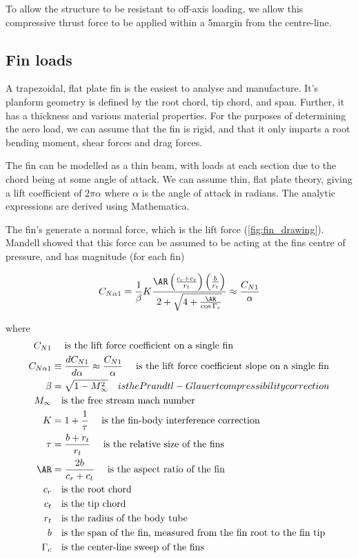 \documentclass[11pt]{article}
\newcommand{\eqn}[1]{\begin{equation}#1\end{equation}}
\newcommand{\eqnalign}[1]{\begin{align*}#1\end{align*}}
\begin{document}
To allow the structure to be resistant to off-axis loading, we allow this compressive thrust force to be applied within a 5\degree margin from the centre-line. 

\subsection{Fin loads}

A trapezoidal, flat plate fin is the easiest to analyse and manufacture. It's planform geometry is defined by the root chord, tip chord, and span. Further, it has a thickness and various material properties. For the purposes of determining the aero load, we can assume that the fin is rigid, and that it only imparts a root bending moment, shear forces and drag forces. 

The fin can be modelled as a thin beam, with loads at each section due to the chord being at some angle of attack. We can assume thin, flat plate theory, giving a lift coefficient of $2\pi \alpha$ where $\alpha$ is the angle of attack in radians. The analytic expressions are derived using Mathematica. 

The fin's generate a normal force, which is the lift force (\autoref{fig:fin_drawing}). Mandell \cite{mandell1973topics} showed that this force can be assumed to be acting at the fins centre of pressure, and has magnitude (for each fin)

\eqn{
C_{N\alpha1} = \frac{1}{\beta} K \frac{\AR \left(\frac{c_r + c_t}{r_t}\right)\left( \frac{b}{r_t}\right) }{2 + \sqrt{4 + \frac{\AR}{\cos \Gamma_c}} } \approx \frac{C_{N1}}{\alpha}
}

where 
\eqnalign{
C_{N1} & \quad \text{ is the lift force coefficient on a single fin}\\
C_{N\alpha1} &\equiv \frac{dC_{N1}}{d\alpha} \approx \frac{C_{N1}}{\alpha}  \quad \text{ is the lift force coefficient slope on a single fin}\\
\beta &=\sqrt{1-M_\infty^2} \quad {is the Prandtl-Glauert compressibility correction}\\
M_\infty & \quad \text{is the free stream mach number}\\
K &= 1 + \frac{1}{\tau} \quad \text{ is the fin-body interference correction}\\
\tau &= \frac{b + r_t}{r_t} \quad \text{ is the relative size of the fins}\\
\AR&=\frac{2 b}{c_r + c_t} \quad \text{ is the aspect ratio of the fin}\\
c_r &\quad  \text{is the root chord}\\
c_t & \quad \text{is the tip chord}\\
r_t & \quad \text{is the radius of the body tube}\\
b & \quad \text{is the span of the fin, measured from the fin root to the fin tip}\\
\Gamma_c & \quad \text{is the center-line sweep of the fins}
}
\end{document}
